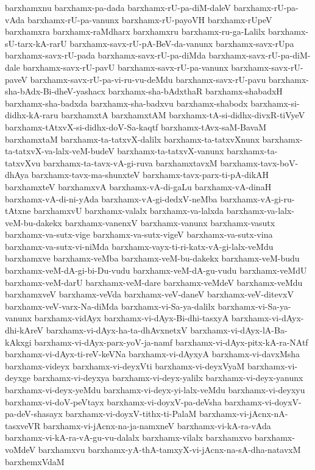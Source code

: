 {barxhamxnu
barxhamx-pa-dada
barxhamx-rU-pa-diM-daleV
barxhamx-rU-pa-vAda
barxhamx-rU-pa-vanunx
barxhamx-rU-payoVH
barxhamx-rUpeV
barxhamxra
barxhamx-raMdharx
barxhamxru
barxhamx-ru-ga-Lalilx
barxhamx-sU-tarx-kA-rarU
barxhamx-savx-rU-pA-BeV-da-vanunx
barxhamx-savx-rUpa
barxhamx-savx-rU-pada
barxhamx-savx-rU-pa-diMda
barxhamx-savx-rU-pa-diM-dale
barxhamx-savx-rU-pavU
barxhamx-savx-rU-pa-vanunx
barxhamx-savx-rU-paveV
barxhamx-savx-rU-pa-vi-ru-vu-deMdu
barxhamx-savx-rU-pavu
barxhamx-sha-bAdx-Bi-dheV-yashacx
barxhamx-sha-bAdxthaR
barxhamx-shabadxH
barxhamx-sha-badxda
barxhamx-sha-badxvu
barxhamx-shabodx
barxhamx-si-didhx-kA-raru
barxhamxtA
barxhamxtAM
barxhamx-tA-si-didhx-divxR-tiVyeV
barxhamx-tAtxvX-si-didhx-doV-Sa-kaqtf
barxhamx-tAvx-saM-BavaM
barxhamxtaM
barxhamx-ta-tatxvX-dalilx
barxhamx-ta-tatxvXnunx
barxhamx-ta-tatxvX-va-lalx-veM-budeV
barxhamx-ta-tatxvX-vanunx
barxhamx-ta-tatxvXvu
barxhamx-ta-tavx-vA-gi-ruva
barxhamxtavxM
barxhamx-tavx-boV-dhAya
barxhamx-tavx-ma-shunxteV
barxhamx-tavx-parx-ti-pA-dikAH
barxhamxteV
barxhamxvA
barxhamx-vA-di-gaLu
barxhamx-vA-dinaH
barxhamx-vA-di-ni-yAda
barxhamx-vA-gi-dedxV-neMba
barxhamx-vA-gi-ru-tAtxne
barxhamxvU
barxhamx-valalx
barxhamx-va-lalxda
barxhamx-va-lalx-veM-bu-dakekx
barxhamx-vanenxV
barxhamx-vanunx
barxhamx-vasutx
barxhamx-va-sutx-vige
barxhamx-va-sutx-vigeV
barxhamx-va-sutx-vina
barxhamx-va-sutx-vi-niMda
barxhamx-vayx-ti-ri-katx-vA-gi-lalx-veMdu
barxhamxve
barxhamx-veMba
barxhamx-veM-bu-dakekx
barxhamx-veM-budu
barxhamx-veM-dA-gi-bi-Du-vudu
barxhamx-veM-dA-gu-vudu
barxhamx-veMdU
barxhamx-veM-darU
barxhamx-veM-dare
barxhamx-veMdeV
barxhamx-veMdu
barxhamxveV
barxhamx-veVda
barxhamx-veV-daneV
barxhamx-veV-ditevxV
barxhamx-veV-varx-Na-diMda
barxhamx-vi-Sa-ya-dalilx
barxhamx-vi-Sa-ya-vanunx
barxhamx-vidAyx
barxhamx-vi-dAyx-Bi-dhi-tasxyA
barxhamx-vi-dAyx-dhi-kAreV
barxhamx-vi-dAyx-ha-ta-dhAvxnetxV
barxhamx-vi-dAyx-lA-Ba-kAkxgi
barxhamx-vi-dAyx-parx-yoV-ja-namf
barxhamx-vi-dAyx-pitx-kA-ra-NAtf
barxhamx-vi-dAyx-ti-reV-keVNa
barxhamx-vi-dAyxyA
barxhamx-vi-davxMsha
barxhamx-videyx
barxhamx-vi-deyxVti
barxhamx-vi-deyxVyaM
barxhamx-vi-deyxge
barxhamx-vi-deyxya
barxhamx-vi-deyx-yalilx
barxhamx-vi-deyx-yanunx
barxhamx-vi-deyx-yeMdu
barxhamx-vi-deyx-yi-lalx-veMdu
barxhamx-vi-deyxyu
barxhamx-vi-doV-peVtayx
barxhamx-vi-doyxV-pa-deVsha
barxhamx-vi-doyxV-pa-deV-shasayx
barxhamx-vi-doyxV-tithx-ti-PalaM
barxhamx-vi-jAcnx-nA-tasxveVR
barxhamx-vi-jAcnx-na-ja-namxneV
barxhamx-vi-kA-ra-vAda
barxhamx-vi-kA-ra-vA-gu-vu-dalalx
barxhamx-vilalx
barxhamxvo
barxhamx-voMdeV
barxhamxvu
barxhamx-yA-thA-tamxyX-vi-jAcnx-na-sA-dha-natavxM
barxhemxVdaM
}
